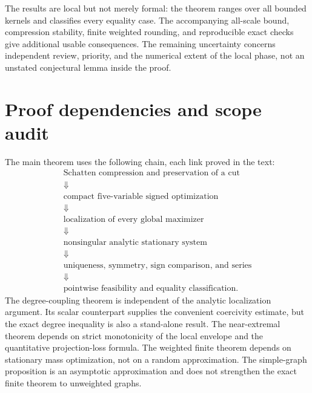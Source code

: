 \documentclass[11pt]{article}
\theoremstyle{definition}
\newcommand{\1}{\mathbf 1}
\begin{document}
The results are local but not merely formal: the theorem ranges over all bounded kernels and classifies every equality case. The accompanying all-scale bound, compression stability, finite weighted rounding, and reproducible exact checks give additional usable consequences. The remaining uncertainty concerns independent review, priority, and the numerical extent of the local phase, not an unstated conjectural lemma inside the proof.

\appendix
\section{Proof dependencies and scope audit}
The main theorem uses the following chain, each link proved in the text:
\[
\begin{gathered}
\text{Schatten compression and preservation of a cut}\\
\Downarrow\\
\text{compact five-variable signed optimization}\\
\Downarrow\\
\text{localization of every global maximizer}\\
\Downarrow\\
\text{nonsingular analytic stationary system}\\
\Downarrow\\
\text{uniqueness, symmetry, sign comparison, and series}\\
\Downarrow\\
\text{pointwise feasibility and equality classification}.
\end{gathered}
\]
The degree-coupling theorem is independent of the analytic localization argument. Its scalar counterpart supplies the convenient coercivity estimate, but the exact degree inequality is also a stand-alone result. The near-extremal theorem depends on strict monotonicity of the local envelope and the quantitative projection-loss formula. The weighted finite theorem depends on stationary mass optimization, not on a random approximation. The simple-graph proposition is an asymptotic approximation and does not strengthen the exact finite theorem to unweighted graphs.
\end{document}
